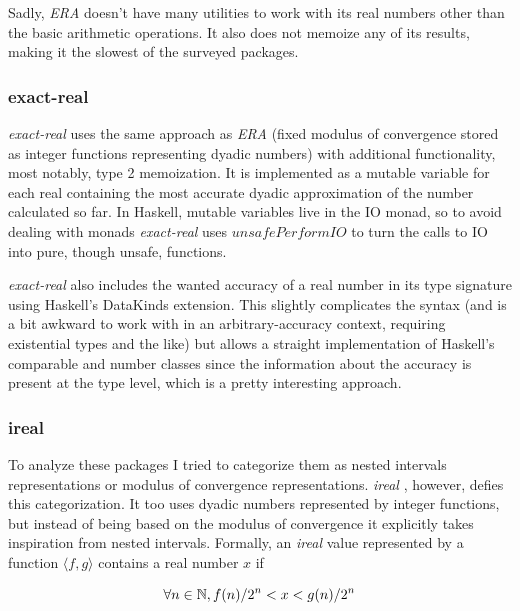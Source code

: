 Sadly, \textit{ERA} doesn't have many utilities to work with its real numbers other than the basic arithmetic operations. It also does not memoize any of its results, making it the slowest of the surveyed packages.

\subsubsection{exact-real}

\textit{exact-real} \cite{ExactR} uses the same approach as \textit{ERA} (fixed modulus of convergence stored as integer functions representing dyadic numbers) with additional functionality, most notably, type 2 memoization. It is implemented as a mutable variable for each real containing the most accurate dyadic approximation of the number calculated so far. In Haskell, mutable variables live in the IO monad, so to avoid dealing with monads \textit{exact-real} uses $unsafePerformIO$ to turn the calls to IO into pure, though unsafe, functions.

\textit{exact-real} also includes the wanted accuracy of a real number in its type signature using Haskell's DataKinds extension. This slightly complicates the syntax (and is a bit awkward to work with in an arbitrary-accuracy context, requiring existential types and the like) but allows a straight implementation of Haskell's comparable and number classes since the information about the accuracy is present at the type level, which is a pretty interesting approach.

\subsubsection{ireal}

To analyze these packages I tried to categorize them as nested intervals representations or modulus of convergence representations. \textit{ireal} \cite{IReal}, however, defies this categorization. It too uses dyadic numbers represented by integer functions, but instead of being based on the modulus of convergence it explicitly takes inspiration from nested intervals. Formally, an \textit{ireal} value represented by a function $\langle f,g \rangle$ contains a real number $x$ if

\begin{equation*}
  \forall n \in \mathbb{N}, f(n) / 2^{n} < x < g(n) / 2^{n}
\end{equation*}

